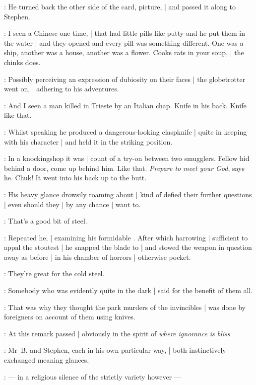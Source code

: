 :
He turned back the other side of the card, picture, |
and passed it along to Stephen.

\Murphy:
I seen a Chinese one time, |
that had little pills like putty and he put them in the water |
and they opened and every pill was something different.
One was a ship, another was a house, another was a flower.
Cooks rats in your soup, |
the chinks does.

:
Possibly perceiving an expression of dubiosity on their faces |
the globetrotter went on, |
adhering to his adventures.

\Murphy:
And I seen a man killed in Trieste by an Italian chap.
Knife in his back.
Knife like that.

:
Whilst speaking he produced a dangerous-looking claspknife |
quite in keeping with his character |
and held it in the striking position.

\Murphy:
In a knockingshop it was |
count of a try-on between two smugglers.
Fellow hid behind a door, come up behind him.
Like that.
\emph{Prepare to meet your God}, says he.
Chuk!
It went into his back up to the butt.

:
His heavy glance drowsily roaming about |
kind of defied their further questions |
even should they |
by any chance |
want to.

\Murphy:
That's a good bit of steel.

:
Repeated he, |
examining his formidable .
After which harrowing  |
sufficient to appal the stoutest |
he snapped the blade to |
and stowed the weapon in question away as before |
in his chamber of horrors |
otherwise pocket.

\Someone:
They're great for the cold steel.

:
Somebody who was evidently quite in the dark |
said for the benefit of them all.

\Someone:
That was why they thought the park murders of the invincibles |
was done by foreigners on account of them using knives.

:
At this remark passed |
obviously in the spirit of \emph{where ignorance is bliss}

:
Mr~B. and Stephen, each in his own particular way, |
both instinctively exchanged meaning glances,

:
    --- in a religious silence of the strictly  variety however ---

